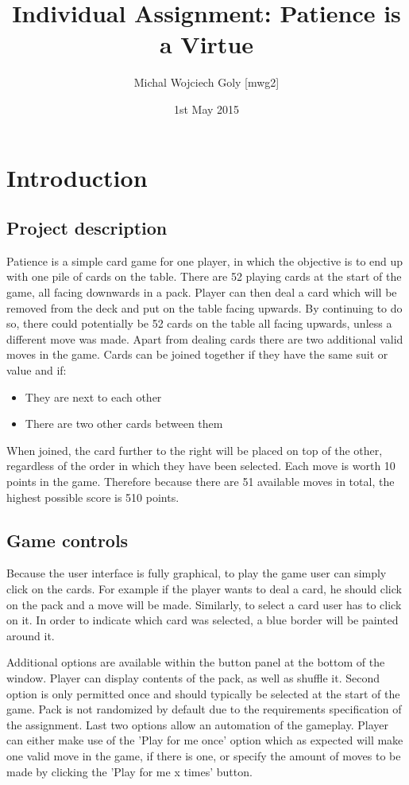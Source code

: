 \documentclass[a4paper, 11pt, titlepage]{article}
\title{Individual Assignment: Patience is a Virtue}
\author{Michal Wojciech Goly [mwg2]}
\date{1st May 2015}
\begin{document}
\maketitle
\tableofcontents
\newpage

\section{Introduction}
\subsection{Project description}
Patience is a simple card game for one player, in which the objective is to end up with 
one pile of cards on the table. There are 52 playing cards at the start of the game, all
facing downwards in a pack. Player can then deal a card which will be removed from the
deck and put on the table facing upwards. By continuing to do so, there could potentially
be 52 cards on the table all facing upwards, unless a different move was made. Apart from
dealing cards there are two additional valid moves in the game. Cards can be joined 
together if they have the same suit or value and if:
\begin{itemize}
	\item They are next to each other
	\item There are two other cards between them
\end{itemize}
When joined, the card further to the right will be placed on top of the other, regardless
of the order in which they have been selected. Each move is worth 10 points in the game. 
Therefore because there are 51 available moves in total, the highest possible score is
510 points. 

\subsection{Game controls} 
Because the user interface is fully graphical, to play the game user can simply click on 
the cards. For example if the player wants to deal a card, he should click on the pack 
and a move will be made. Similarly, to select a card user has to click on it. In order to
indicate which card was selected, a blue border will be painted around it.

Additional options are available within the button panel at the bottom of the window. 
Player can display contents of the pack, as well as shuffle it. Second option is only
permitted once and should typically be selected at the start of the game. Pack is not 
randomized by default due to the requirements specification of the assignment. Last two
options allow an automation of the gameplay. Player can either make use of the 'Play for
me once' option which as expected will make one valid move in the game, if there is one,
or specify the amount of moves to be made by clicking the 'Play for me x times' button.
\end{document}
